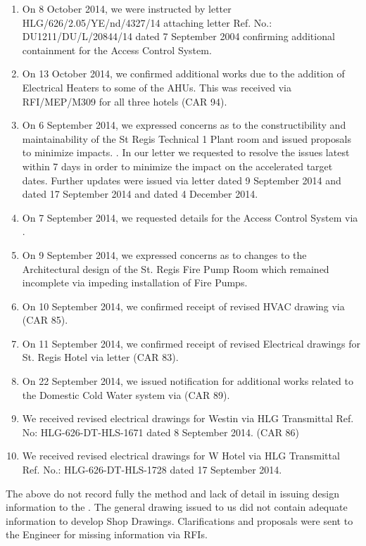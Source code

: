\begin{enumerate}
\item On 8 October 2014, we were instructed by letter HLG/626/2.05/YE/nd/4327/14 attaching \KA letter Ref. No.: DU1211/DU/L/20844/14 dated 7 September 2004 confirming additional containment for the Access Control System.

\item On 13 October 2014, we confirmed additional works due to the addition of Electrical Heaters to some of the AHUs. This was received via RFI/MEP/M309 for all three hotels (CAR 94).

\item On 6 September 2014, we expressed concerns as to the constructibility and maintainability of the St Regis Technical 1 Plant room and issued proposals to minimize impacts. . In our letter we requested \KA to resolve the issues latest within 7 days in order to minimize the impact on the accelerated target dates. Further updates were issued via letter  dated 9 September 2014 and  dated 17 September 2014 and  dated 4 December 2014.


\item On 7 September 2014, we requested details for the Access Control System via .

\item On 9 September 2014, we expressed concerns as to changes to the Architectural design of the St. Regis Fire Pump Room which remained incomplete via  impeding installation of Fire Pumps.

\item On 10 September 2014, we confirmed receipt of revised HVAC drawing via  (CAR 85).

\item On 11 September 2014, we confirmed receipt of revised Electrical drawings for St. Regis Hotel via letter  (CAR 83).

\item On 22 September 2014, we issued notification for additional works related to the Domestic Cold Water system via  (CAR 89).

\item We received revised electrical drawings for Westin via HLG Transmittal Ref. No: HLG-626-DT-HLS-1671 dated 8 September 2014. (CAR 86)

\item We received revised electrical drawings for W Hotel via HLG Transmittal Ref. No.: HLG-626-DT-HLS-1728 dated 17 September 2014.
\end{enumerate}

The above do not record fully the method and lack of detail in issuing design information to the \JV. The general drawing issued to us did not contain adequate information to develop Shop Drawings. Clarifications and proposals were sent to the Engineer for missing information  via RFIs. 



